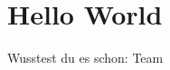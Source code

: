 \documentclass[
    load-dhbw-templates,
    add-tocs-to-toc,
    debug,
    language = ngerman,
    auto-intro-pages = custom
]{iodhbwm}
\begin{document}
    \chapter{Hello World}
        Wusstest du es schon: \ac{Team}
        
    \Blinddocument
\end{document}
